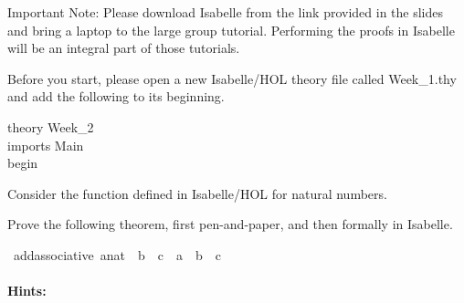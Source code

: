 %
\begin{isabellebody}%
%
%
\isadelimtheory
%
\endisadelimtheory
%
\isatagtheory
%
\endisatagtheory
{\isafoldtheory}%
%
\isadelimtheory
%
\endisadelimtheory
%
\begin{isamarkuptext}%
%
\end{isamarkuptext}\isamarkuptrue%
%
\begin{isamarkuptext}%
Important Note: Please download Isabelle from the link provided in the slides and bring a 
      laptop to the large group tutorial. Performing the proofs in Isabelle will be an integral part
      of those tutorials.%
\end{isamarkuptext}\isamarkuptrue%
%
\begin{isamarkuptext}%
Before you start, please open a new Isabelle/HOL theory file called Week\_1.thy and add the
       following to its beginning.

\noindent theory Week\_2\\
imports Main\\
begin%
\end{isamarkuptext}\isamarkuptrue%
%
\begin{isamarkuptext}%
%
\end{isamarkuptext}\isamarkuptrue%
%
\begin{isamarkuptext}%
Consider the function \isa{{\isacharparenleft}{\kern0pt}{\isacharplus}{\kern0pt}{\isacharparenright}{\kern0pt}} defined in Isabelle/HOL for natural numbers.

Prove the following theorem, first pen-and-paper, and then formally in Isabelle.%
\end{isamarkuptext}\isamarkuptrue%
\isamarkupfalse%
\ add{\isacharunderscore}{\kern0pt}associative{\isacharcolon}{\kern0pt}\ {\isachardoublequoteopen}{\isacharparenleft}{\kern0pt}{\isacharparenleft}{\kern0pt}a{\isacharcolon}{\kern0pt}{\isacharcolon}{\kern0pt}nat{\isacharparenright}{\kern0pt}\ {\isacharplus}{\kern0pt}\ b{\isacharparenright}{\kern0pt}\ {\isacharplus}{\kern0pt}\ c\ {\isacharequal}{\kern0pt}\ a\ {\isacharplus}{\kern0pt}\ {\isacharparenleft}{\kern0pt}b\ {\isacharplus}{\kern0pt}\ c{\isacharparenright}{\kern0pt}{\isachardoublequoteclose}%
\begin{isamarkuptext}%
\paragraph{Hints:}


\end{isamarkuptext}
\end{isabellebody}
